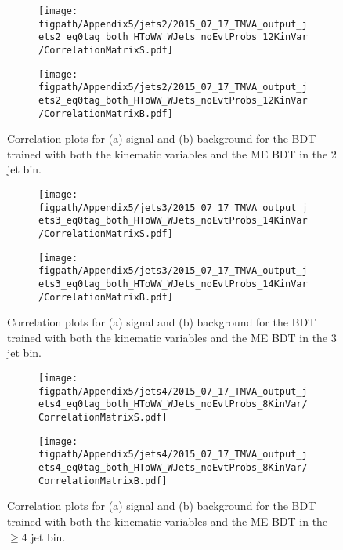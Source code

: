 \begin{figure}[!hbt]
    \centering
    \begin{subfigure}[t]{0.48\textwidth}
        \texttt{[image: \\figpath/Appendix5/jets2/2015\_07\_17\_TMVA\_output\_jets2\_eq0tag\_both\_HToWW\_WJets\_noEvtProbs\_12KinVar/CorrelationMatrixS.pdf]}
        \caption{}
        \label{fig:KinMEBDT_jets2_CorrelationS}
    \end{subfigure}
    \begin{subfigure}[t]{0.48\textwidth}
        \texttt{[image: \\figpath/Appendix5/jets2/2015\_07\_17\_TMVA\_output\_jets2\_eq0tag\_both\_HToWW\_WJets\_noEvtProbs\_12KinVar/CorrelationMatrixB.pdf]}
        \caption{}
        \label{fig:KinMEBDT_jets2_CorrelationB}
    \end{subfigure}
    \caption{Correlation plots for (a) signal and (b) background for the BDT trained with both the kinematic variables and the ME BDT in the 2 jet bin.}
    \label{fig:KinMEBDT_jets2_Correlations}
\end{figure}

\begin{figure}[!hbt]
    \centering
    \begin{subfigure}[t]{0.48\textwidth}
        \texttt{[image: \\figpath/Appendix5/jets3/2015\_07\_17\_TMVA\_output\_jets3\_eq0tag\_both\_HToWW\_WJets\_noEvtProbs\_14KinVar/CorrelationMatrixS.pdf]}
        \caption{}
        \label{fig:KinMEBDT_jets3_CorrelationS}
    \end{subfigure}
    \begin{subfigure}[t]{0.48\textwidth}
        \texttt{[image: \\figpath/Appendix5/jets3/2015\_07\_17\_TMVA\_output\_jets3\_eq0tag\_both\_HToWW\_WJets\_noEvtProbs\_14KinVar/CorrelationMatrixB.pdf]}
        \caption{}
        \label{fig:KinMEBDT_jets3_CorrelationB}
    \end{subfigure}
    \caption{Correlation plots for (a) signal and (b) background for the BDT trained with both the kinematic variables and the ME BDT in the 3 jet bin.}
    \label{fig:KinMEBDT_jets3_Correlations}
\end{figure}

\begin{figure}[!hbt]
    \centering
    \begin{subfigure}[t]{0.48\textwidth}
        \texttt{[image: \\figpath/Appendix5/jets4/2015\_07\_17\_TMVA\_output\_jets4\_eq0tag\_both\_HToWW\_WJets\_noEvtProbs\_8KinVar/CorrelationMatrixS.pdf]}
        \caption{}
        \label{fig:KinMEBDT_jets4_CorrelationS}
    \end{subfigure}
    \begin{subfigure}[t]{0.48\textwidth}
        \texttt{[image: \\figpath/Appendix5/jets4/2015\_07\_17\_TMVA\_output\_jets4\_eq0tag\_both\_HToWW\_WJets\_noEvtProbs\_8KinVar/CorrelationMatrixB.pdf]}
        \caption{}
        \label{fig:KinMEBDT_jets4_CorrelationB}
    \end{subfigure}
    \caption{Correlation plots for (a) signal and (b) background for the BDT trained with both the kinematic variables and the ME BDT in the $\geqslant$4 jet bin.}
    \label{fig:KinMEBDT_jets4_Correlations}
\end{figure}
\clearpage
